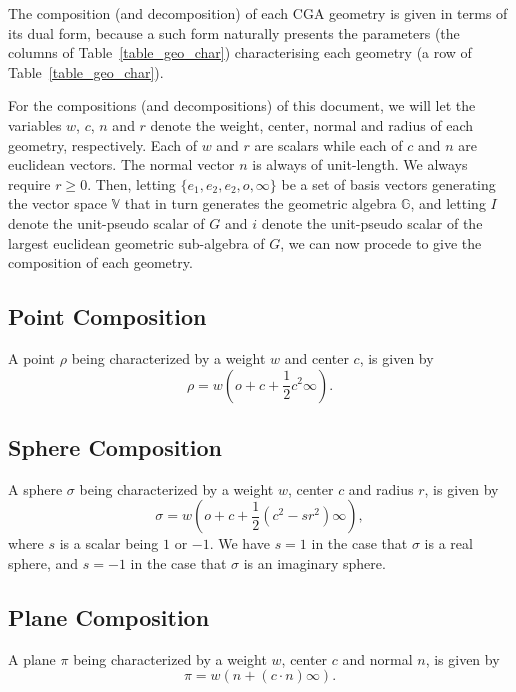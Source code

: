 \documentclass[12pt]{article}
\newcommand{\G}{\mathbb{G}}
\newcommand{\V}{\mathbb{V}}
\newcommand{\nvao}{o}
\newcommand{\nvai}{\infty}
\begin{document}
The composition (and decomposition) of each CGA geometry is given in terms of its
dual form, because a such form naturally presents the parameters (the columns of
Table~\ref{table_geo_char}) characterising each geometry (a row of Table~\ref{table_geo_char}).

For the compositions (and decompositions) of this document, we will let the variables $w$,
$c$, $n$ and $r$ denote the weight, center, normal and radius of each geometry, respectively.
Each of $w$ and $r$ are scalars while each of $c$ and $n$ are euclidean vectors.  The normal vector
$n$ is always of unit-length.  We always require $r\geq 0$.
Then, letting $\{e_1,e_2,e_2,\nvao,\nvai\}$ be a set of basis vectors generating the
vector space $\V$ that in turn generates the geometric algebra $\G$, and
letting $I$ denote the unit-pseudo scalar of $G$ and $i$ denote the
unit-pseudo scalar of the largest euclidean geometric sub-algebra of $G$,
we can now procede to give the composition of each geometry.

\subsection{Point Composition}

A point $\rho$ being characterized by a weight $w$ and center $c$, is given by
\begin{equation}\label{equ_point}
\rho = w\left(\nvao + c + \frac{1}{2}c^2\nvai\right).
\end{equation}

\subsection{Sphere Composition}

A sphere $\sigma$ being characterized by a weight $w$, center $c$ and radius $r$,
is given by
\begin{equation}\label{equ_sphere}
\sigma = w\left(\nvao + c + \frac{1}{2}(c^2-sr^2)\nvai\right),
\end{equation}
where $s$ is a scalar being $1$ or $-1$.  We have $s=1$ in the
case that $\sigma$ is a real sphere, and $s=-1$ in the case that
$\sigma$ is an imaginary sphere.

\subsection{Plane Composition}

A plane $\pi$ being characterized by a weight $w$, center $c$ and normal $n$, is
given by
\begin{equation}\label{equ_plane}
\pi = w\left(n + (c\cdot n)\nvai\right).
\end{equation}
\end{document}
